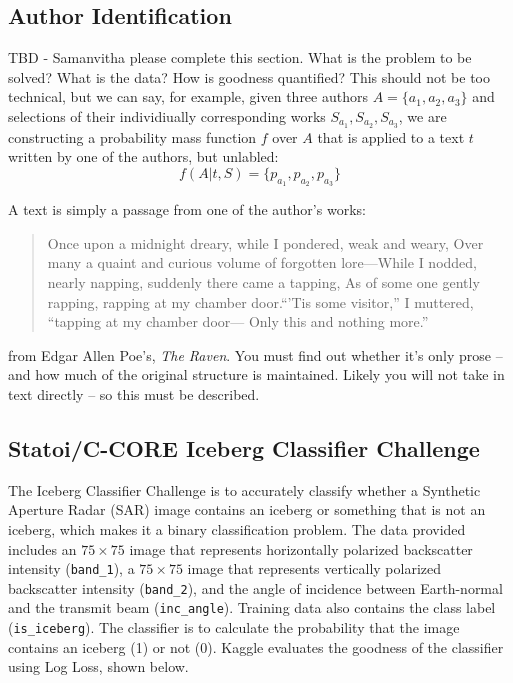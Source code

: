 \documentclass[fleqn,10pt]{SelfArx} %
\begin{document}
\subsection{Author Identification}
TBD - Samanvitha please complete this section.
What is the problem to be solved?  What is the data? How is goodness quantified?  This should not be too technical, but we can say, for example, given three authors $A = \{a_1, a_2, a_3\}$ and selections of their individiually corresponding works $S_{a_1}, S_{a_2}, S_{a_3}$,  we are constructing a probability  mass function $f$ over $A$ that is applied to a text $t$ written by one of the authors, but unlabled:
\begin{equation}
f(A|t,S) = \{p_{a_1}, p_{a_2}, p_{a_3}\}
\end{equation}

A text is simply a passage from one of the author's works:
\begin{quote}
Once upon a midnight dreary, while I pondered, weak and weary, Over many a quaint and curious volume of forgotten lore—While I nodded, nearly napping, suddenly there came a tapping, As of some one gently rapping, rapping at my chamber door.“’Tis some visitor,” I muttered, “tapping at my chamber door— Only this and nothing more.”
\end{quote}
from Edgar Allen Poe's, \textit{The Raven}.  You must find out whether it's only prose -- and how much of the original structure is maintained.  Likely you will not take in text directly -- so this must be described.


\subsection{Statoi/C-CORE Iceberg Classifier Challenge}

The Iceberg Classifier Challenge is to accurately classify whether a Synthetic Aperture Radar (SAR) image contains an iceberg or something that is not an iceberg, which makes it a binary classification problem.  The data provided includes an $75 \times 75$ image that represents horizontally polarized backscatter intensity (\texttt{band\_1}), a $75 \times 75$ image that represents vertically polarized backscatter intensity (\texttt{band\_2}), and the angle of incidence between Earth-normal and the transmit beam (\texttt{inc\_angle}).  Training data also contains the class label (\texttt{is\_iceberg}).  The classifier is to calculate the probability that the image contains an iceberg (1) or not (0).  Kaggle evaluates the goodness of the classifier using Log Loss, shown below.
\end{document}
